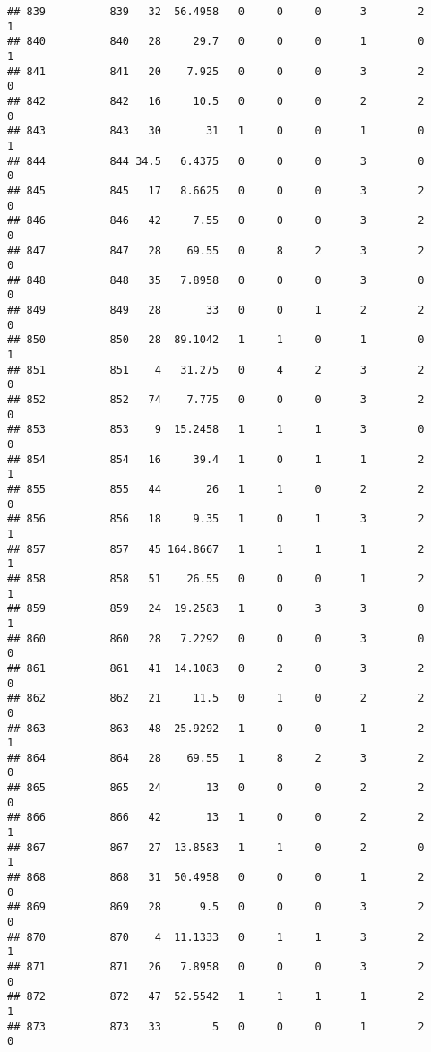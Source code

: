 \documentclass[
]{article}
\begin{document}
\begin{verbatim}
## 839          839   32  56.4958   0     0     0      3        2         1
## 840          840   28     29.7   0     0     0      1        0         1
## 841          841   20    7.925   0     0     0      3        2         0
## 842          842   16     10.5   0     0     0      2        2         0
## 843          843   30       31   1     0     0      1        0         1
## 844          844 34.5   6.4375   0     0     0      3        0         0
## 845          845   17   8.6625   0     0     0      3        2         0
## 846          846   42     7.55   0     0     0      3        2         0
## 847          847   28    69.55   0     8     2      3        2         0
## 848          848   35   7.8958   0     0     0      3        0         0
## 849          849   28       33   0     0     1      2        2         0
## 850          850   28  89.1042   1     1     0      1        0         1
## 851          851    4   31.275   0     4     2      3        2         0
## 852          852   74    7.775   0     0     0      3        2         0
## 853          853    9  15.2458   1     1     1      3        0         0
## 854          854   16     39.4   1     0     1      1        2         1
## 855          855   44       26   1     1     0      2        2         0
## 856          856   18     9.35   1     0     1      3        2         1
## 857          857   45 164.8667   1     1     1      1        2         1
## 858          858   51    26.55   0     0     0      1        2         1
## 859          859   24  19.2583   1     0     3      3        0         1
## 860          860   28   7.2292   0     0     0      3        0         0
## 861          861   41  14.1083   0     2     0      3        2         0
## 862          862   21     11.5   0     1     0      2        2         0
## 863          863   48  25.9292   1     0     0      1        2         1
## 864          864   28    69.55   1     8     2      3        2         0
## 865          865   24       13   0     0     0      2        2         0
## 866          866   42       13   1     0     0      2        2         1
## 867          867   27  13.8583   1     1     0      2        0         1
## 868          868   31  50.4958   0     0     0      1        2         0
## 869          869   28      9.5   0     0     0      3        2         0
## 870          870    4  11.1333   0     1     1      3        2         1
## 871          871   26   7.8958   0     0     0      3        2         0
## 872          872   47  52.5542   1     1     1      1        2         1
## 873          873   33        5   0     0     0      1        2         0

\end{verbatim}
\end{document}
